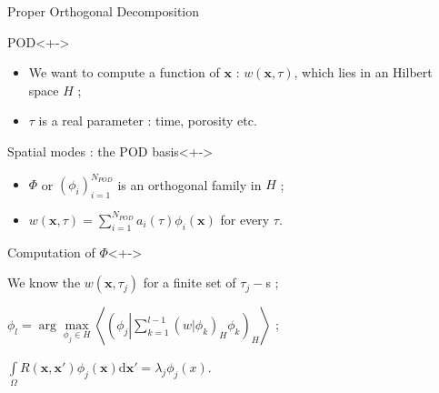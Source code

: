 
\begin{frame}{Proper Orthogonal Decomposition}
%
\begin{block}{POD}<+->
%
\begin{itemize}
\item<+-> We want to compute a function of $\mathbf{x}$ : $w(\mathbf{x},\tau)$, which lies in an Hilbert space $H$ ;
\item<+-> $\tau$ is a real parameter : time, porosity etc.
\end{itemize}
%
\end{block}
%
\begin{block}{Spatial modes : the POD basis}<+->
\begin{itemize}
\item<+-> $\Phi$ or $(\phi_i)_{i=1}^{N_{POD}}$ is an orthogonal family in $H$ ;
\item<+-> $w(\mathbf{x},\tau)=\sum\limits_{i=1}^{N_{POD}} a_i(\tau)\phi_i(\mathbf{x})$ for every $\tau$.
\end{itemize}
\end{block}
%
\begin{block}{Computation of $\Phi$}<+->
\begin{description}
\item<+-> [Data :] We know the $w(\mathbf{x},\tau_j)$ for a finite set of $\tau_j-$s ;
\item<+-> [Optimality of $\Phi$] $\phi_l= \arg\max\limits_{\phi_j\in H}\left\langle\left(\phi_j\left|\sum\limits_{k=1}^{l-1}\left(w|\phi_k\right)_H\phi_k\right.\right)_H\right\rangle$ ;
\item<+-> [Fredholm equation] $\int\limits_{\Omega}R(\mathbf{x},\mathbf{x'})\phi_j (\mathbf{x})\text{d}\mathbf{x'}=\lambda_j \phi_j (x)$.
\end{description}
\end{block}
%
\end{frame}

